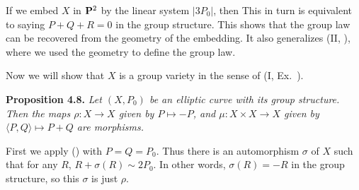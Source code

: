 {If we embed $X$ in $\mathbf{P}^2$ by the linear system $|3P_0|$, then  This in turn is equivalent to saying $P+Q+R=0$ in the group structure. This shows that the group law can be recovered from the geometry of the embedding. It also generalizes (II, ), where we used the geometry to define the group law.

Now we will show that $X$ is a group variety in the sense of (I, Ex.~).

\medskip
\noindent\hypertarget{result-IV-4.8}{}\textbf{Proposition 4.8.} \emph{Let $(X,P_0)$ be an elliptic curve with its group structure. Then the maps $\rho\colon X\to X$ given by $P\mapsto-P$, and $\mu\colon X\times X\to X$ given by $\langle P,Q\rangle\mapsto P+Q$ are morphisms.}

\Proof First we apply () with $P=Q=P_0$. Thus there is an automorphism $\sigma$ of $X$ such that for any $R$, $R+\sigma(R)\sim2P_0$. In other words, $\sigma(R)=-R$ in the group structure, so this $\sigma$ is just $\rho$.
}
